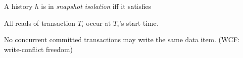 \begin{frame}{}
  A history $h$ is in \emph{\large snapshot isolation} iff it satisfies  \\[0.20cm]
  \begin{description}
    \item[Snapshot Read:] All reads of transaction $T_i$ occur at $T_i$'s start time.%
    \item[Snapshot Write:] No concurrent committed transactions may write the same data item. (WCF: write-conflict freedom)
  \end{description}
\end{frame}
